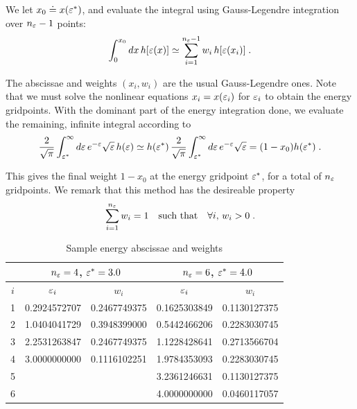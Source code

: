 \noindent
We let $x_0 \doteq x({\varepsilon}^*)$, and evaluate the integral 
using Gauss-Legendre integration \cite{burden:1985} 
over $n_{\varepsilon}-1$ points:
%
\begin{equation}
\int_0^{x_0} dx \, h[{\varepsilon}(x)] \simeq \sum_{i=1}^{n_{\varepsilon} -1} 
w_i \, h[{\varepsilon}(x_i)] \; .
\end{equation}

\noindent
The abscissae and weights $(x_i,w_i)$ are the usual 
Gauss-Legendre ones.  Note that we must solve 
the nonlinear equations $x_i = x({\varepsilon}_i)$ for 
${\varepsilon}_i$ to obtain the energy gridpoints.  With the 
dominant part of the energy integration done, we 
evaluate the remaining, infinite integral according to
%
\begin{equation}
\frac{2}{\sqrt{\pi}} \int_{{\varepsilon}^*}^\infty 
d{\varepsilon} \, e^{-{\varepsilon}} \sqrt{{\varepsilon}} \, h({\varepsilon}) \simeq 
 h({\varepsilon}^*) \, \frac{2}{\sqrt{\pi}} \int_{{\varepsilon}^*}^\infty 
d{\varepsilon} \, e^{-{\varepsilon}} \sqrt{{\varepsilon}} = (1-x_0) h({\varepsilon}^*) \; .
\end{equation}

\noindent
This gives the final weight $1-x_0$ at the energy gridpoint 
${\varepsilon}^*$, for a total of $n_{\varepsilon}$ gridpoints.  We remark 
that this method has the desireable property
%
\begin{equation}
\sum_{i=1}^{n_{\varepsilon}} w_i = 1 
\quad\hbox{such that} \quad \forall i, \, w_i > 0 \; .
\label{esum}
\end{equation}

\begin{table}
\begin{center}
\begin{tabular}{|c||c|c||c|c|} \hline
& \multicolumn{2}{|c||}{$n_{\varepsilon} = 4$, ${\varepsilon}^* = 3.0$} 
& \multicolumn{2}{c|}{$n_{\varepsilon} = 6$, ${\varepsilon}^* = 4.0$} \\ \hline
$i$ & ${\varepsilon}_i$ & $w_i$ & ${\varepsilon}_i$ & $w_i$ \\ \hline\hline
 1 & 0.2924572707 & 0.2467749375 & 0.1625303849 & 0.1130127375 \\
 2 & 1.0404041729 & 0.3948399000 & 0.5442466206 & 0.2283030745 \\
 3 & 2.2531263847 & 0.2467749375 & 1.1228428641 & 0.2713566704 \\
 4 & 3.0000000000 & 0.1116102251 & 1.9784353093 & 0.2283030745 \\
 5 &  & &  3.2361246631 & 0.1130127375 \\ 
 6 &  & &  4.0000000000 & 0.0460117057 \\ \hline
\end{tabular}
\caption{Sample energy abscissae and weights}
\label{tab.energy}
\end{center}
\end{table}

